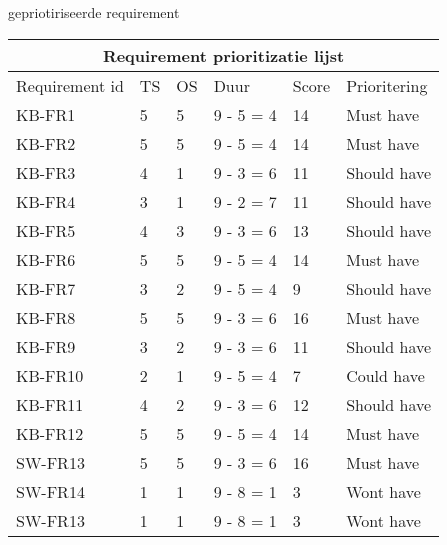 \begin{graphic}
	\vspace{0.2cm}
	\captionsetup{type=table}
	\caption{gepriotiriseerde requirement}
	\begin{tabular}{ |p{3cm}||p{1cm}|p{1cm}|p{1.5cm}|p{1cm}|p{2.5cm}| }
		\hline
		\multicolumn{6}{|c|}{Requirement prioritizatie lijst}       \\
		\hline
		Requirement id & TS & OS & Duur      & Score & Prioritering \\
		\hline
		KB-FR1         & 5  & 5  & 9 - 5 = 4 & 14    & Must have    \\
		KB-FR2         & 5  & 5  & 9 - 5 = 4 & 14    & Must have    \\
		KB-FR3         & 4  & 1  & 9 - 3 = 6 & 11    & Should have  \\
		KB-FR4         & 3  & 1  & 9 - 2 = 7 & 11    & Should have  \\
		KB-FR5         & 4  & 3  & 9 - 3 = 6 & 13    & Should have  \\
		KB-FR6         & 5  & 5  & 9 - 5 = 4 & 14    & Must have    \\
		KB-FR7         & 3  & 2  & 9 - 5 = 4 & 9     & Should have  \\
		KB-FR8         & 5  & 5  & 9 - 3 = 6 & 16    & Must have    \\
		KB-FR9         & 3  & 2  & 9 - 3 = 6 & 11    & Should have  \\
		KB-FR10        & 2  & 1  & 9 - 5 = 4 & 7     & Could have   \\
		KB-FR11        & 4  & 2  & 9 - 3 = 6 & 12    & Should have  \\
		KB-FR12        & 5  & 5  & 9 - 5 = 4 & 14    & Must have    \\
		SW-FR13        & 5  & 5  & 9 - 3 = 6 & 16    & Must have    \\
		SW-FR14        & 1  & 1  & 9 - 8 = 1 & 3     & Wont have    \\
		SW-FR13        & 1  & 1  & 9 - 8 = 1 & 3     & Wont have    \\
		\hline
	\end{tabular}	\label{tab:RequirementPrioritization}
	\vspace{0.2cm}
\end{graphic}

